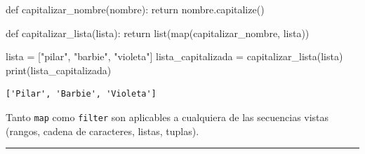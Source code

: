 \documentclass[
  letterpaper,
  DIV=11,
  numbers=noendperiod]{scrreprt}
\newenvironment{Shaded}{\begin{snugshade}}{\end{snugshade}}
\newcommand{\BuiltInTok}[1]{\textcolor[rgb]{0.00,0.23,0.31}{#1}}
\newcommand{\ControlFlowTok}[1]{\textcolor[rgb]{0.00,0.23,0.31}{#1}}
\newcommand{\KeywordTok}[1]{\textcolor[rgb]{0.00,0.23,0.31}{#1}}
\newcommand{\NormalTok}[1]{\textcolor[rgb]{0.00,0.23,0.31}{#1}}
\newcommand{\OperatorTok}[1]{\textcolor[rgb]{0.37,0.37,0.37}{#1}}
\newcommand{\StringTok}[1]{\textcolor[rgb]{0.13,0.47,0.30}{#1}}
\begin{document}
\begin{Shaded}
\begin{Highlighting}[]
\KeywordTok{def}\NormalTok{ capitalizar\_nombre(nombre):}
  \ControlFlowTok{return}\NormalTok{ nombre.capitalize()}

\KeywordTok{def}\NormalTok{ capitalizar\_lista(lista):}
  \ControlFlowTok{return} \BuiltInTok{list}\NormalTok{(}\BuiltInTok{map}\NormalTok{(capitalizar\_nombre, lista))}

\NormalTok{lista }\OperatorTok{=}\NormalTok{ [}\StringTok{"pilar"}\NormalTok{, }\StringTok{"barbie"}\NormalTok{, }\StringTok{"violeta"}\NormalTok{]}
\NormalTok{lista\_capitalizada }\OperatorTok{=}\NormalTok{ capitalizar\_lista(lista)}
\BuiltInTok{print}\NormalTok{(lista\_capitalizada)}
\end{Highlighting}
\end{Shaded}

\begin{verbatim}
['Pilar', 'Barbie', 'Violeta']
\end{verbatim}

\begin{tcolorbox}[enhanced jigsaw, bottomrule=.15mm, leftrule=.75mm, opacityback=0, colback=white, toprule=.15mm, bottomtitle=1mm, opacitybacktitle=0.6, rightrule=.15mm, left=2mm, arc=.35mm, coltitle=black, title=\textcolor{quarto-callout-note-color}{\faInfo}\hspace{0.5em}{Note}, breakable, toptitle=1mm, colframe=quarto-callout-note-color-frame, titlerule=0mm, colbacktitle=quarto-callout-note-color!10!white]

Tanto \texttt{map} como \texttt{filter} son aplicables a cualquiera de
las secuencias vistas (rangos, cadena de caracteres, listas, tuplas).

\end{tcolorbox}

\hfill\break

\begin{center}\rule{0.5\linewidth}{0.5pt}\end{center}

\hfill\break
\end{document}
